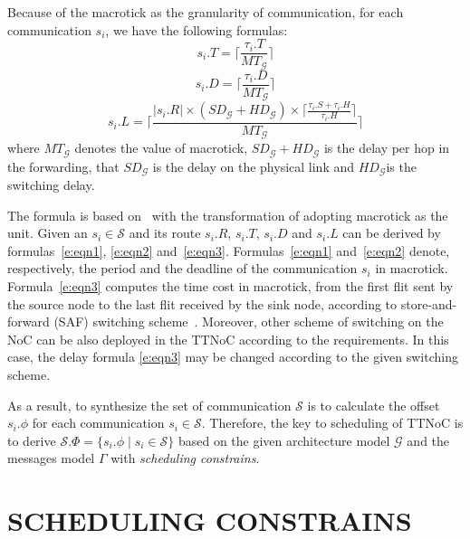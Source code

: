 \documentclass[journal]{IEEEtran}
\newcommand{\calG}{\mathcal{G}}
\newcommand{\calS}{\mathcal{S}}
\newcommand{\SD}{\mathit{SD}_\calG}
\newcommand{\HD}{\mathit{HD}_\calG}
\newcommand{\MT}{\mathit{MT}_\calG}
\begin{document}
Because of the macrotick as the granularity of communication,
for each communication $s_{i}$,
we have the following formulas:
\begin{equation}
\label{e:eqn1}
  s_i.T = \lceil\frac{\tau_{i}.T}{\MT} \rceil
\end{equation}
\begin{equation}
\label{e:eqn2}
  s_i.D = \lceil\frac{\tau_{i}.D}{\MT}\rceil
\end{equation}
\begin{equation}
\label{e:eqn3}
  s_i.L = \lceil\frac{|s_i.R| \times (\SD+\HD) \times
    \lceil\frac{\tau_{i}.S + \tau_{i}.H}{\tau_{i}.H  }\rceil}{\MT}\rceil
\end{equation}
where $\MT$ denotes the value of macrotick,
$\SD+\HD$ is the delay per hop in the forwarding,
that $\SD$ is the delay on the physical link and $\HD$is the switching delay.

The formula is based on~\cite{DBLP:books/daglib/0087651} with the transformation of adopting macrotick as the unit.
Given an $s_{i}\in\calS$ and its route $s_i.R$, $s_i.T$, $s_i.D$ and $s_i.L$ can be derived by formulas~\ref{e:eqn1}, 
\ref{e:eqn2} and~\ref{e:eqn3}. 
Formulas~\ref{e:eqn1} and~\ref{e:eqn2} denote, 
respectively, 
the period and the deadline of the communication $s_i$ in macrotick.
Formula~\ref{e:eqn3} computes the time cost in macrotick,
 from the first flit sent by the source node to the last flit received by the sink node, 
 according to store-and-forward (SAF) switching scheme~\cite{DBLP:books/daglib/0087651}. 
Moreover, other scheme of switching on the NoC can be also deployed in the TTNoC according to the requirements. In this case, the delay formula \ref{e:eqn3} may be changed according to the given switching scheme.

As a result, to synthesize the set of communication $\calS$ is to
calculate the offset $s_i.\phi$ for each communication
$s_i\in\calS$. Therefore, the key to scheduling of TTNoC is to derive
$\calS.\Phi = \{s_i.\phi\mid s_i\in\calS\}$ based on the given
architecture model $\calG$ and the messages model $\Gamma$ with
\emph{scheduling constrains}.


\section{SCHEDULING CONSTRAINS\label{s:constrain}}
\end{document}
